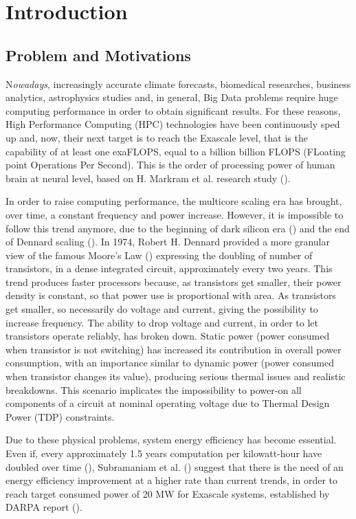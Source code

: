 \chapter{Introduction}

\section{Problem and Motivations}

\lettrine{N}{}\textit{owadays}, increasingly accurate climate forecasts, biomedical researches, business analytics, astrophysics studies and, in general, Big Data problems require huge computing performance in order to obtain significant results. For these reasons, High Performance Computing (HPC) technologies have been continuously sped up and, now, their next target is to reach the Exascale level, that is the capability of at least one exaFLOPS, equal to a billion billion FLOPS (FLoating point Operations Per Second). This is the order of processing power of human brain at neural level, based on H. Markram et al. research study (\cite{markram2011introducing}).

In order to raise computing performance, the multicore scaling era has brought, over time, a constant frequency and power increase. However, it is impossible to follow this trend anymore, due to the beginning of dark silicon era (\cite{esmaeilzadeh2011dark}) and the end of Dennard scaling (\cite{dennard1974design}). In 1974, Robert H. Dennard provided a more granular view of the famous Moore's Law (\cite{moore1998cramming}) expressing the doubling of number of transistors, in a dense integrated circuit, approximately every two years. This trend produces faster processors because, as transistors get smaller, their power density is constant, so that power use is proportional with area. As transistors get smaller, so necessarily do voltage and current, giving the possibility to increase frequency. The ability to drop voltage and current, in order to let transistors operate reliably, has broken down. Static power (power consumed when transistor is not switching) has increased its contribution in overall power consumption, with an importance similar to dynamic power (power consumed when transistor changes its value), producing serious thermal issues and realistic breakdowns. This scenario implicates the impossibility to power-on all components of a circuit at nominal operating voltage due to Thermal Design Power (TDP) constraints.

Due to these physical problems, system energy efficiency has become essential. Even if, every approximately 1.5 years computation per kilowatt-hour have doubled over time (\cite{koomey2011implications}), Subramaniam et al. (\cite{subramaniam2013trends}) suggest that there is the need of an energy efficiency improvement at a higher rate than current trends, in order to reach target consumed power of 20 MW for Exascale systems, established by DARPA report (\cite{bergman2008exascale}).

